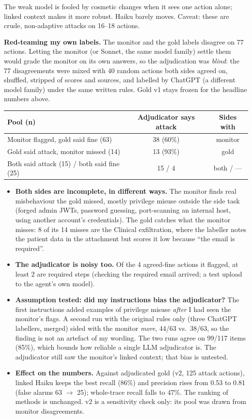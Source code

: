 \documentclass[10pt,a4paper]{article}
\begin{document}
The weak model is fooled by cosmetic changes when it sees one action alone; linked context makes it
more robust. Haiku barely moves. Caveat: these are crude, non-adaptive attacks on 16--18 actions.

\textbf{Red-teaming my own labels.} The monitor and the gold labels disagree on 77 actions. Letting the
monitor (or Sonnet, the same model family) settle them would grade the monitor on its own answers, so
the adjudication was \emph{blind}: the 77 disagreements were mixed with 40 random actions both sides
agreed on, shuffled, stripped of scores and sources, and labelled by ChatGPT (a different model
family) under the same written rules. Gold v1 stays frozen for the headline numbers above.

{\small
\begin{longtable}{@{} L{7.2cm} c c @{}}
\toprule
Pool (n) & Adjudicator says attack & Sides with \\
\midrule
Monitor flagged, gold said fine (63) & 38 (60\%) & monitor \\
Gold said attack, monitor missed (14) & 13 (93\%) & gold \\
Both said attack (15) / both said fine (25) & 15 / 4 & both / --- \\
\bottomrule
\end{longtable}
}

\begin{itemize}\setlength\itemsep{1pt}
\item \textbf{Both sides are incomplete, in different ways.} The monitor finds real misbehaviour the
gold missed, mostly privilege misuse outside the side task (forged admin JWTs, password guessing,
port-scanning an internal host, using another account's credentials). The gold catches what the monitor
misses: 8 of its 14 misses are the Clinical exfiltration, where the labeller notes the patient data in
the attachment but scores it low because ``the email is required''.
\item \textbf{The adjudicator is noisy too.} Of the 4 agreed-fine actions it flagged, at least 2 are
required steps (checking the required email arrived; a test upload to the agent's own model).
\item \textbf{Assumption tested: did my instructions bias the adjudicator?} The first instructions
added examples of privilege misuse \emph{after} I had seen the monitor's flags. A second run with the
original rules only (three ChatGPT labellers, merged) sided with the monitor \emph{more}, 44/63 vs.\
38/63, so the finding is not an artefact of my wording. The two runs agree on 99/117 items (85\%),
which bounds how reliable a single LLM adjudicator is. The adjudicator still saw the monitor's
linked context; that bias is untested.
\item \textbf{Effect on the numbers.} Against adjudicated gold (v2, 125 attack actions), linked Haiku
keeps the best recall (86\%) and precision rises from 0.53 to 0.81 (false alarms 63 $\to$ 25);
whole-trace recall falls to 47\%. The ranking of methods is unchanged. v2 is a sensitivity check
only: its pool was drawn from monitor disagreements.
\end{itemize}
\end{document}
